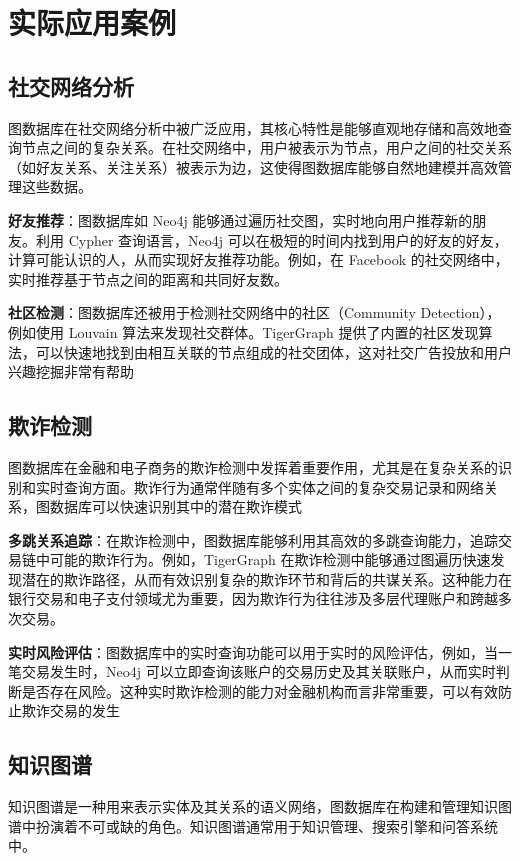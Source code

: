 \section{实际应用案例}

\subsection{社交网络分析}
图数据库在社交网络分析中被广泛应用，其核心特性是能够直观地存储和高效地查询节点之间的复杂关系。在社交网络中，用户被表示为节点，用户之间的社交关系（如好友关系、关注关系）被表示为边，这使得图数据库能够自然地建模并高效管理这些数据。

\textbf{好友推荐}：图数据库如 Neo4j 能够通过遍历社交图，实时地向用户推荐新的朋友。利用 Cypher 查询语言，Neo4j 可以在极短的时间内找到用户的好友的好友，计算可能认识的人，从而实现好友推荐功能。例如，在 Facebook 的社交网络中，实时推荐基于节点之间的距离和共同好友数\cite{ahmad2020missing,wang2022common}。

\textbf{社区检测}：图数据库还被用于检测社交网络中的社区（Community Detection），例如使用 Louvain 算法来发现社交群体。TigerGraph 提供了内置的社区发现算法，可以快速地找到由相互关联的节点组成的社交团体，这对社交广告投放和用户兴趣挖掘非常有帮助\cite{tsitseklis2020scalable,beis2015benchmarking}

\vspace{1cm}
\subsection{欺诈检测}
图数据库在金融和电子商务的欺诈检测中发挥着重要作用，尤其是在复杂关系的识别和实时查询方面。欺诈行为通常伴随有多个实体之间的复杂交易记录和网络关系，图数据库可以快速识别其中的潜在欺诈模式

\textbf{多跳关系追踪}：在欺诈检测中，图数据库能够利用其高效的多跳查询能力，追踪交易链中可能的欺诈行为。例如，TigerGraph 在欺诈检测中能够通过图遍历快速发现潜在的欺诈路径，从而有效识别复杂的欺诈环节和背后的共谋关系。这种能力在银行交易和电子支付领域尤为重要，因为欺诈行为往往涉及多层代理账户和跨越多次交易\cite{mao2022financial,cheng2020graph,li2022internet}。

\textbf{实时风险评估}：图数据库中的实时查询功能可以用于实时的风险评估，例如，当一笔交易发生时，Neo4j 可以立即查询该账户的交易历史及其关联账户，从而实时判断是否存在风险。这种实时欺诈检测的能力对金融机构而言非常重要，可以有效防止欺诈交易的发生

\vspace{1cm}
\subsection{知识图谱}
知识图谱是一种用来表示实体及其关系的语义网络，图数据库在构建和管理知识图谱中扮演着不可或缺的角色。知识图谱通常用于知识管理、搜索引擎和问答系统中\cite{黄恒琪2019知识图谱研究综述}。

